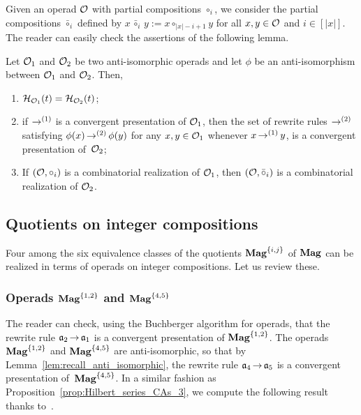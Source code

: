 Given an operad $\mathcal{O}$ with partial compositions $\circ_i$, we consider
the partial compositions $\bar{\circ}_i$ defined by
\begin{math}
  x \, \bar{\circ}_i \, y := x \circ_{|x| - i + 1} y
\end{math}
for all $x, y \in \mathcal{O}$ and $i \in [|x|]$. The reader can easily check
the assertions of the following lemma.
\medbreak

\begin{Lemma} \label{lem:recall_anti_isomorphic}
    Let $\mathcal{O}_1$ and $\mathcal{O}_2$ be two anti-isomorphic operads and let
    $\phi$ be an anti-isomorphism between $\mathcal{O}_1$ and $\mathcal{O}_2$. Then,
    \begin{enumerate}[label={(\it\roman*)}]
        \item \label{item:recall_anti_isomorphic_1}
        $\mathcal{H}_{\mathcal{O}_1}(t) = \mathcal{H}_{\mathcal{O}_2}(t)$;
        \item \label{item:recall_anti_isomorphic_2}
        if $\operatorname{\to}^{(1)}$ is a convergent presentation of $\mathcal{O}_1$, then
        the set of rewrite rules $\operatorname{\to}^{(2)}$ satisfying
        $\phi(x) \operatorname{\to}^{(2)} \phi(y)$ for any $x, y \in \mathcal{O}_1$ whenever
        $x \operatorname{\to}^{(1)} y$, is a convergent presentation of~$\mathcal{O}_2$;
        \item\label{item:realization_anti_isomorphic}
        If $\left(\mathcal{O}, \circ_i\right)$ is a combinatorial realization
        of $\mathcal{O}_1$, then
        \begin{math}
          \left(\mathcal{O}, \bar{\circ}_i\right)
        \end{math}
        is a combinatorial realization of $\mathcal{O}_2$.
    \end{enumerate}
\end{Lemma}
\medbreak

\subsection{Quotients on integer compositions}
Four among the six equivalence classes of the quotients
$\mathbf{Mag}^{\{i, j\}}$ of $\mathbf{Mag}$ can be realized in terms of operads on
integer compositions. Let us review these.
\medbreak

\subsubsection{Operads $\mathbf{Mag}^{\{1, 2\}}$ and $\mathbf{Mag}^{\{4, 5\}}$}
\label{subsubsec:Mag_1_2}
The reader can check, using the Buchberger algorithm for operads,
that the rewrite rule $\mathfrak{a}_2 \operatorname{\to} \mathfrak{a}_1$ is a
convergent presentation of $\mathbf{Mag}^{\{1, 2\}}$. The operads
$\mathbf{Mag}^{\{1, 2\}}$ and $\mathbf{Mag}^{\{4, 5\}}$ are anti-isomorphic, so that
by Lemma~\ref{lem:recall_anti_isomorphic}, the rewrite rule
$\mathfrak{a}_4 \operatorname{\to} \mathfrak{a}_5$ is a convergent presentation of~$\mathbf{Mag}^{\{4, 5\}}$.
In a similar fashion as Proposition~\ref{prop:Hilbert_series_CAs_3}, we
compute the following result thanks to~\cite{Gir18}.
\medbreak

